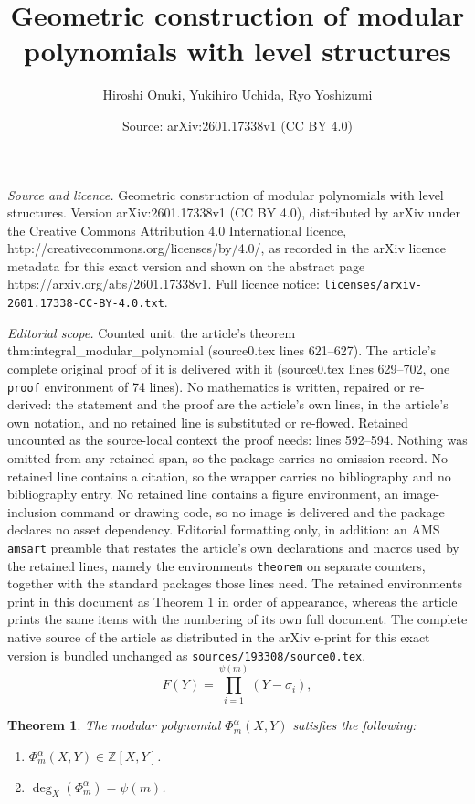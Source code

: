 \documentclass[10pt,a4paper]{amsart}
\title{Geometric construction of modular polynomials with level structures}
\author{Hiroshi Onuki, Yukihiro Uchida, Ryo Yoshizumi}
\date{Source: arXiv:2601.17338v1 (CC BY 4.0)}
\newtheorem{theorem}{Theorem}
\newcommand{\Z}{\mathbb{Z}}
\begin{document}
\maketitle

\noindent\emph{Source and licence.} Geometric construction of modular polynomials with level structures. Version arXiv:2601.17338v1 (CC BY 4.0), distributed by arXiv under the Creative Commons Attribution 4.0 International licence, http://creativecommons.org/licenses/by/4.0/, as recorded in the arXiv licence metadata for this exact version and shown on the abstract page https://arxiv.org/abs/2601.17338v1. Full licence notice: \texttt{licenses/arxiv-2601.17338-CC-BY-4.0.txt}.\par\smallskip

\noindent\textit{Editorial scope.} Counted unit: the article's theorem thm:integral\_modular\_polynomial (source0.tex lines 621--627). The article's complete original proof of it is delivered with it (source0.tex lines 629--702, one \texttt{proof} environment of 74 lines). No mathematics is written, repaired or re-derived: the statement and the proof are the article's own lines, in the article's own notation, and no retained line is substituted or re-flowed.  Retained uncounted as the source-local context the proof needs: lines 592--594.  Nothing was omitted from any retained span, so the package carries no omission record.  No retained line contains a citation, so the wrapper carries no bibliography and no bibliography entry.  No retained line contains a figure environment, an image-inclusion command or drawing code, so no image is delivered and the package declares no asset dependency.  Editorial formatting only, in addition: an AMS \texttt{amsart} preamble that restates the article's own declarations and macros used by the retained lines, namely the environments \texttt{theorem} on separate counters, together with the standard packages those lines need.  The retained environments print in this document as Theorem 1 in order of appearance, whereas the article prints the same items with the numbering of its own full document.  The complete native source of the article as distributed in the arXiv e-print for this exact version is bundled unchanged as \texttt{sources/193308/source0.tex}.
    \begin{equation}\label{eq:def_mod_poly}
        F(Y) = \prod_{i=1}^{\psi(m)} (Y - \sigma_i),
    \end{equation}

\begin{theorem}\label{thm:integral_modular_polynomial}
    The modular polynomial $\Phi_m^{\alpha}(X, Y)$ satisfies the following:
    \begin{enumerate}
        \item $\Phi_m^{\alpha}(X, Y) \in \Z[X, Y]$. \label{enum:integer_coeff}
        \item $\deg_X(\Phi_m^{\alpha}) = \psi(m)$. \label{enum:degree_X}
    \end{enumerate}
\end{theorem}
\end{document}
